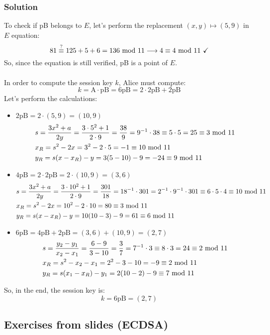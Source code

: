 \subsubsection*{Solution}
To check if pB belongs to $E$, let's perform the replacement $(x,y)\mapsto(5,9)$ in $E$ equation:
$$81\stackrel{\text{?}}{\equiv}125+5+6=136\text{ mod }11\longrightarrow4\equiv4\text{ mod }11\text{ \checkmark}$$
So, since the equation is still verified, pB is a point of $E$.\\\\
In order to compute the session key $k$, Alice must compute:
$$k=\text{A}\cdot\text{pB}=6\text{pB}=2\cdot2\text{pB}+2\text{pB}$$
Let's perform the calculations:
\begin{itemize}
    \item $2\text{pB}=2\cdot(5,9)=(10,9)$
    \begin{align*}
        &s=\dfrac{3x^2+a}{2y}=\dfrac{3\cdot5^2+1}{2\cdot9}=\dfrac{38}{9}=9^{-1}\cdot38\equiv5\cdot5=25\equiv3\text{ mod }11\\
        &x_R=s^2-2x=3^2-2\cdot5=-1\equiv10\text{ mod }11\\
        &y_R=s(x-x_R)-y=3(5-10)-9=-24\equiv9\text{ mod }11
    \end{align*}
    \item $4\text{pB}=2\cdot2\text{pB}=2\cdot(10,9)=(3,6)$
    \begin{align*}
        &s=\dfrac{3x^2+a}{2y}=\dfrac{3\cdot10^2+1}{2\cdot9}=\dfrac{301}{18}=18^{-1}\cdot301=2^{-1}\cdot9^{-1}\cdot301\equiv6\cdot5\cdot4\equiv10\text{ mod }11\\
        &x_R=s^2-2x=10^2-2\cdot10=80\equiv3\text{ mod }11\\
        &y_R=s(x-x_R)-y=10(10-3)-9=61\equiv6\text{ mod }11
    \end{align*}
    \item $6\text{pB}=4\text{pB}+2\text{pB}=(3,6)+(10,9)=(2,7)$
    \begin{align*}
        &s=\dfrac{y_2-y_1}{x_2-x_1}=\dfrac{6-9}{3-10}=\dfrac{3}{7}=7^{-1}\cdot 3\equiv8\cdot3=24\equiv2\text{ mod }11\\
        &x_R=s^2-x_2-x_1=2^2-3-10=-9\equiv2\text{ mod }11\\
        &y_R=s(x_1-x_R)-y_1=2(10-2)-9\equiv7\text{ mod }11
    \end{align*}
\end{itemize}
So, in the end, the session key is:
$$k=6\text{pB}=(2,7)$$

\newpage
\subsection{Exercises from slides (ECDSA)}

